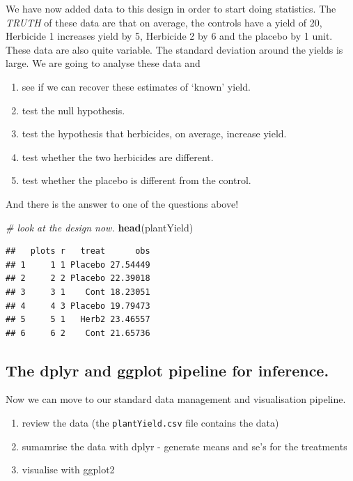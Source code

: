 \documentclass[
]{book}
\newenvironment{Shaded}{\begin{snugshade}}{\end{snugshade}}
\newcommand{\CommentTok}[1]{\textcolor[rgb]{0.56,0.35,0.01}{\textit{#1}}}
\newcommand{\FunctionTok}[1]{\textcolor[rgb]{0.13,0.29,0.53}{\textbf{#1}}}
\newcommand{\NormalTok}[1]{#1}
\providecommand{\tightlist}{%
  \setlength{\itemsep}{0pt}\setlength{\parskip}{0pt}}
\begin{document}
We have now added data to this design in order to start doing statistics. The \emph{TRUTH} of these data are that on average, the controls have a yield of 20, Herbicide 1 increases yield by 5, Herbicide 2 by 6 and the placebo by 1 unit. These data are also quite variable. The standard deviation around the yields is large. We are going to analyse these data and

\begin{enumerate}
\def\labelenumi{\arabic{enumi}.}
\tightlist
\item
  see if we can recover these estimates of `known' yield.
\item
  test the null hypothesis.
\item
  test the hypothesis that herbicides, on average, increase yield.
\item
  test whether the two herbicides are different.
\item
  test whether the placebo is different from the control.
\end{enumerate}

And there is the answer to one of the questions above!

\begin{Shaded}
\begin{Highlighting}[]
\CommentTok{\# look at the design now.}
\FunctionTok{head}\NormalTok{(plantYield)}
\end{Highlighting}
\end{Shaded}

\begin{verbatim}
##   plots r   treat      obs
## 1     1 1 Placebo 27.54449
## 2     2 2 Placebo 22.39018
## 3     3 1    Cont 18.23051
## 4     4 3 Placebo 19.79473
## 5     5 1   Herb2 23.46557
## 6     6 2    Cont 21.65736
\end{verbatim}

\subsection{The dplyr and ggplot pipeline for inference.}\label{the-dplyr-and-ggplot-pipeline-for-inference.}

Now we can move to our standard data management and visualisation pipeline.

\begin{enumerate}
\def\labelenumi{\arabic{enumi}.}
\tightlist
\item
  review the data (the \texttt{plantYield.csv} file contains the data)
\item
  sumamrise the data with dplyr - generate means and se's for the treatments
\item
  visualise with ggplot2
\end{enumerate}
\end{document}
